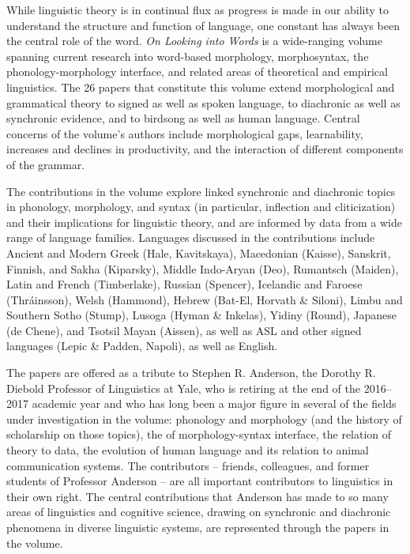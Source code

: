 \begin{refsection}


While linguistic theory is in continual flux as progress is made in our ability to understand the structure and function of language, one constant has always been the central role of the word. \textit{On Looking into Words} is a wide-ranging volume spanning current research into word-based morphology, morphosyntax, the phonology-morphology interface, and related areas of theoretical and empirical linguistics.  The 26 papers that constitute this volume extend morphological and grammatical theory to signed as well as spoken language, to diachronic as well as synchronic evidence, and to birdsong as well as human language. Central concerns of the volume's authors include morphological gaps, learnability, increases and declines in productivity, and the interaction of different components of the grammar. 

The contributions in the volume explore linked synchronic and diachronic topics in phonology, morphology, and syntax (in particular, inflection and cliticization) and their implications for linguistic theory, and are informed by data from a wide range of language families. Languages discussed in the contributions include Ancient and Modern Greek (Hale, Kavitskaya), Macedonian (Kaisse), Sanskrit, Finnish, and Sakha (Kiparsky), Middle Indo-Aryan (Deo), Rumantsch (Maiden), Latin and French (Timberlake), Russian (Spencer), Icelandic and Faroese (Thráinsson), Welsh (Hammond), Hebrew (Bat-El, Horvath \& Siloni), Limbu and Southern Sotho (Stump), Lusoga (Hyman \& Inkelas), Yidiny (Round), Japanese (de Chene), and Tsotsil Mayan (Aissen), as well as ASL and other signed languages (Lepic \& Padden, Napoli), as well as English.  

The papers are offered as a tribute to Stephen R. Anderson, the Dorothy R. Diebold Professor of Linguistics at Yale, who is retiring at the end of the 2016--2017 academic year and who has long been a major figure in several of the fields under investigation in the volume: phonology and morphology (and the history of scholarship on those topics), the of morphology-syntax interface, the relation of theory to data, the evolution of human language and its relation to animal communication systems. The contributors -- friends, colleagues, and former students of Professor Anderson -- are all important contributors to linguistics in their own right. The central contributions that Anderson has made to so many areas of linguistics and cognitive science, drawing on synchronic and diachronic phenomena in diverse linguistic systems, are represented through the papers in the volume.


\end{refsection}

